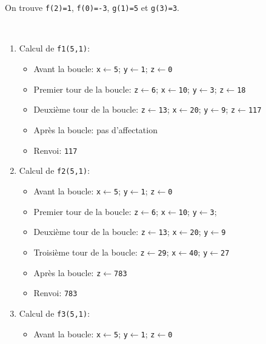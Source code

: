 \chapter{}



\begin{correction}
	On trouve \texttt{f(2)=1}, \texttt{f(0)=-3}, \texttt{g(1)=5} et \texttt{g(3)=3}.
\end{correction}

\begin{correction}~
	\begin{enumerate}
		\item Calcul de \texttt{f1(5,1)}:
		\begin{itemize}
			\item Avant la boucle: \texttt{x$\leftarrow$5}; \texttt{y$\leftarrow$1}; \texttt{z$\leftarrow$0}
			\item Premier tour de la boucle: \texttt{z$\leftarrow$6}; \texttt{x$\leftarrow$10}; \texttt{y$\leftarrow$3}; \texttt{z$\leftarrow$18}
			\item Deuxième tour de la boucle: \texttt{z$\leftarrow$13}; \texttt{x$\leftarrow$20}; \texttt{y$\leftarrow$9}; \texttt{z$\leftarrow$117}
			\item Après la boucle: pas d'affectation
			\item Renvoi: \texttt{117}
		\end{itemize}
		\item Calcul de \texttt{f2(5,1)}:
		\begin{itemize}
			\item Avant la boucle: \texttt{x$\leftarrow$5}; \texttt{y$\leftarrow$1}; \texttt{z$\leftarrow$0}
			\item Premier tour de la boucle: \texttt{z$\leftarrow$6}; \texttt{x$\leftarrow$10}; \texttt{y$\leftarrow$3};
			\item Deuxième tour de la boucle: \texttt{z$\leftarrow$13}; \texttt{x$\leftarrow$20}; \texttt{y$\leftarrow$9}
			\item Troisième tour de la boucle: \texttt{z$\leftarrow$29}; \texttt{x$\leftarrow$40}; \texttt{y$\leftarrow$27}
			\item Après la boucle: \texttt{z$\leftarrow$783}
			\item Renvoi: \texttt{783}
		\end{itemize}
		\item Calcul de \texttt{f3(5,1)}:
		\begin{itemize}
			\item Avant la boucle: \texttt{x$\leftarrow$5}; \texttt{y$\leftarrow$1}; \texttt{z$\leftarrow$0}

\end{itemize}
\end{enumerate}
\end{correction}
